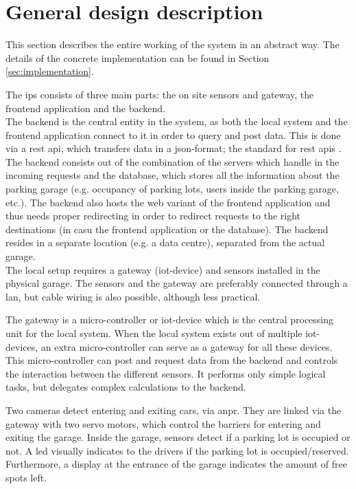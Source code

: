 \section{General design description}\label{sec:general design}
This section describes the entire working of the system in an abstract way. The details of the concrete implementation can be found in Section \ref{sec:implementation}.

\ind The \ac{ips} consists of three main parts: the on site sensors and gateway, the frontend application and the backend. \\

The backend is the central entity in the system, as both the local system and the frontend application connect to it in order to query and post data. This is done via a \ac{rest} \ac{api}, which transfers data in a \ac{json}-format; the standard for \ac{rest} \acp{api} \cite{rest_apis}. The backend consists out of the combination of the servers which handle in the incoming requests and the database, which stores all the information about the parking garage (e.g. occupancy of parking lots, users inside the parking garage, etc.).
The backend also hosts the web variant of the frontend application and thus needs proper redirecting in order to redirect requests to the right destinations (in casu the frontend application or the database). The backend resides in a separate location (e.g. a data centre), separated from the actual garage. \\

The local setup requires a gateway  (\ac{iot}-device) and sensors installed in the physical garage. The sensors and the gateway are preferably connected through a \ac{lan}, but cable wiring is also possible, although less practical.

\ind The gateway is a micro-controller or \ac{iot}-device which is the central processing unit for the local system. When the local system exists out of multiple \ac{iot}-devices, an extra micro-controller can serve as a gateway for all these devices. This micro-controller can post and request data from the backend and controls the interaction between the different sensors. It performs only simple logical tasks, but delegates complex calculations to the backend.

\ind Two cameras detect entering and exiting cars, via \ac{anpr}. They are linked via the gateway with two servo motors, which control the barriers for entering and exiting the garage. Inside the garage, sensors detect if a parking lot is occupied or not. A \ac{led} visually indicates to the drivers if the parking lot is occupied/reserved. Furthermore, a display at the entrance of the garage indicates the amount of free spots left. \\

